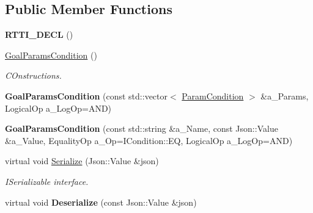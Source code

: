 \subsection*{Public Member Functions}
\begin{DoxyCompactItemize}
\item 
\mbox{\label{struct_goal_params_condition_a8f597c0f1db798aa788d3a1dc1f0501d}} 
{\bfseries R\+T\+T\+I\+\_\+\+D\+E\+CL} ()
\item 
\mbox{\label{struct_goal_params_condition_a8236d070bbfe98f800c5fd4b011fc37e}} 
\hyperlink{struct_goal_params_condition_a8236d070bbfe98f800c5fd4b011fc37e}{Goal\+Params\+Condition} ()
\begin{DoxyCompactList}\small\item\em C\+Onstructions. \end{DoxyCompactList}\item 
\mbox{\label{struct_goal_params_condition_a1f398643684232a13596781c948e935b}} 
{\bfseries Goal\+Params\+Condition} (const std\+::vector$<$ \hyperlink{struct_goal_params_condition_1_1_param_condition}{Param\+Condition} $>$ \&a\+\_\+\+Params, Logical\+Op a\+\_\+\+Log\+Op=A\+ND)
\item 
\mbox{\label{struct_goal_params_condition_a37331cb548a61b77a8ee6bfe00a2b554}} 
{\bfseries Goal\+Params\+Condition} (const std\+::string \&a\+\_\+\+Name, const Json\+::\+Value \&a\+\_\+\+Value, Equality\+Op a\+\_\+\+Op=I\+Condition\+::\+EQ, Logical\+Op a\+\_\+\+Log\+Op=A\+ND)
\item 
\mbox{\label{struct_goal_params_condition_a6a16d977aa0d7ab00bf866d40fe3a1e8}} 
virtual void \hyperlink{struct_goal_params_condition_a6a16d977aa0d7ab00bf866d40fe3a1e8}{Serialize} (Json\+::\+Value \&json)
\begin{DoxyCompactList}\small\item\em I\+Serializable interface. \end{DoxyCompactList}\item 
\mbox{\label{struct_goal_params_condition_a16933f1509a8cac1e61ebfacc72a36e9}} 
virtual void {\bfseries Deserialize} (const Json\+::\+Value \&json)

\end{DoxyCompactItemize}
